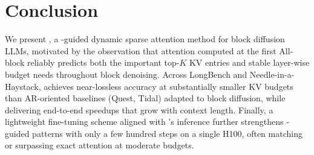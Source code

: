 \section{Conclusion}
\label{sec:conclusion}
We present \name, a \mask-guided dynamic sparse attention method for block diffusion LLMs, motivated by the observation that attention computed at the first All-\mask block reliably predicts both the important top-$K$ KV entries and stable layer-wise budget needs throughout block denoising.
Across LongBench and Needle-in-a-Haystack, \name achieves near-lossless accuracy at substantially smaller KV budgets than AR-oriented baselines (Quest, Tidal) adapted to block diffusion, while delivering end-to-end speedups that grow with context length.
Finally, a lightweight fine-tuning scheme aligned with \name’s inference further strengthens \mask-guided patterns with only a few hundred steps on a single H100, often matching or surpassing exact attention at moderate budgets.
\clearpage